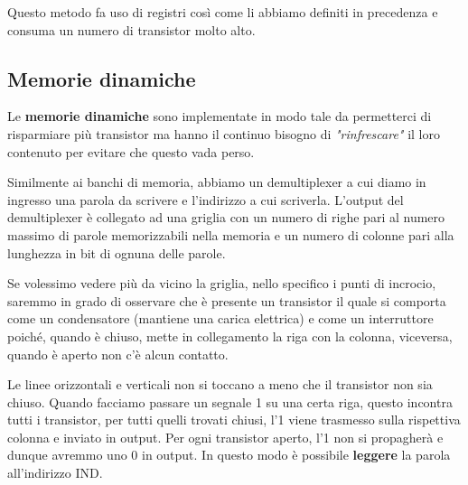 Questo metodo fa uso di registri così come li abbiamo definiti in precedenza e consuma un numero di
transistor molto alto.

\subsection{Memorie dinamiche}
Le \textbf{memorie dinamiche} sono implementate in modo tale da permetterci di risparmiare più
transistor ma hanno il continuo bisogno di \emph{"rinfrescare"} il loro contenuto per evitare che
questo vada perso.

Similmente ai banchi di memoria, abbiamo un demultiplexer a cui diamo in ingresso una parola da
scrivere e l'indirizzo a cui scriverla. L'output del demultiplexer è collegato ad una griglia
con un numero di righe pari al numero massimo di parole memorizzabili nella memoria e un numero
di colonne pari alla lunghezza in bit di ognuna delle parole.
\begin{center}
\end{center}
Se volessimo vedere più da vicino la griglia, nello specifico i punti di incrocio, saremmo in grado
di osservare che è presente un transistor il quale si comporta come un condensatore (mantiene una
carica elettrica) e come un interruttore poiché, quando è chiuso, mette in collegamento la riga con
la colonna, viceversa, quando è aperto non c'è alcun contatto.
\begin{center}
\end{center}
Le linee orizzontali e verticali non si toccano a meno che il transistor non sia chiuso. Quando
facciamo passare un segnale 1 su una certa riga, questo incontra tutti i transistor, per tutti
quelli trovati chiusi, l'1 viene trasmesso sulla rispettiva colonna e inviato in output. Per ogni
transistor aperto, l'1 non si propagherà e dunque avremmo uno 0 in output. In questo modo è
possibile \textbf{leggere} la parola all'indirizzo IND.

